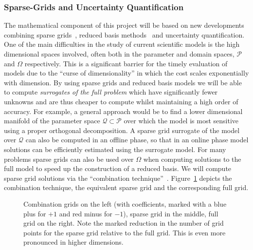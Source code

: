 \subsubsection*{Sparse-Grids and Uncertainty Quantification}

The mathematical component of this project will be based on new
developments combining sparse
grids~\parencite{BungartzGriebel2004}, reduced basis
methods~\parencite{LiebermanEtal2010,Peherstorfer2013,ChenSchwab2015,PeherstorferWillcox2015}
and uncertainty quantification. One of the main difficulties in the
study of current scientific models is the high dimensional spaces
involved, often both in the parameter and domain spaces, $\mathcal{P}$
and $\Omega$ respectively. This is a significant barrier for the
timely evaluation of models due to the ``curse of dimensionality'' in
which the cost scales exponentially with dimension. By using sparse
grids and reduced basis models we will be able to compute
\emph{surrogates of the full problem} which have significantly fewer
unknowns and are thus cheaper to compute whilst maintaining a high
order of accuracy. For example, a general approach would be to find a
lower dimensional manifold of the parameter space
$\mathcal{Q}\subset\mathcal{P}$ over which the model is most sensitive
using a proper orthogonal decomposition. A sparse grid surrogate of
the model over $\mathcal{Q}$ can also be computed in an offline phase,
so that in an online phase model solutions can be efficiently
estimated using the surrogate model. For many problems sparse grids
can also be used over $\Omega$ when computing solutions to the full
model to speed up the construction of a reduced basis. We will compute
sparse grid solutions via the ``combination
technique''~\parencite{Griebel1990}. Figure~\ref{fig:sparse_grids}
depicts the combination technique, the equivalent sparse grid and the
corresponding full grid.

\begin{figure}
  \centering
    
  \caption{Combination grids on the left (with coefficients, marked with
    a blue plus for $+1$ and red minus for $-1$), sparse grid in the
    middle, full grid on the right. Note the marked reduction in the number of 
    grid points for the sparse grid relative to the full grid. 
   This is even more pronounced in higher dimensions.}
  \label{fig:sparse_grids}
\end{figure}

